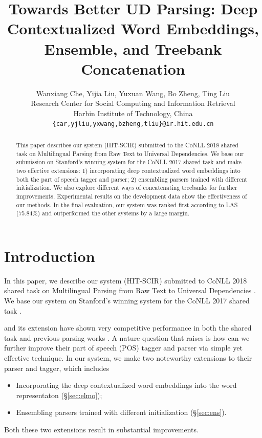 \documentclass[11pt,a4paper]{article}
\title{Towards Better UD Parsing: Deep Contextualized Word Embeddings, Ensemble, and Treebank Concatenation}
\author{Wanxiang Che, Yijia Liu, Yuxuan Wang, Bo Zheng, Ting Liu \\
	Research Center for Social Computing and Information Retrieval \\
	Harbin Institute of Technology, China \\
	{\tt \{car,yjliu,yxwang,bzheng,tliu\}@ir.hit.edu.cn}	}
\date{}
\begin{document}
\maketitle


\begin{abstract}
This paper describes our system (HIT-SCIR)
submitted to the  CoNLL 2018 shared
task on Multilingual Parsing from Raw Text to 
Universal Dependencies.
We base our submission on Stanford's winning system for the CoNLL 2017 shared task
and make two effective extensions: 
1) incorporating deep contextualized
word embeddings into both the part of speech
tagger and parser;
2) ensembling parsers trained with different initialization.
We also explore different ways of concatenating treebanks
for further improvements.
Experimental results on the development data
show the effectiveness of our methods.
In the final evaluation,
our system was ranked first according to LAS (75.84\%)
and outperformed the other systems by a large margin.

\end{abstract}

\section{Introduction}

In this paper, we describe our system (HIT-SCIR) submitted to CoNLL 2018 shared
task on Multilingual Parsing from Raw Text to 
Universal Dependencies \cite{udst:overview}.
We base our system on Stanford's winning system \citep[\S\ref{sec:biaffine}]{dozat-qi-manning:2017:K17-3}
for the CoNLL 2017 shared task \cite{udst:overview2017}.

\citet{DBLP:journals/corr/DozatM16} and
its extension \cite{dozat-qi-manning:2017:K17-3} have
shown very competitive performance in both the shared task \cite{dozat-qi-manning:2017:K17-3}
and previous parsing works \cite{ma-hovy:2017:I17-1,shi-huang-lee:2017:EMNLP2017,N18-1088,DBLP:journals/corr/abs-1805-01087}.
A nature question that raises is how can we further improve
their part of speech (POS) tagger and parser
via simple yet effective technique.
In our system, we make two noteworthy extensions to their parser and tagger,
which includes
\begin{itemize}
	\item Incorporating the deep contextualized word embeddings \cite[ELMo]{N18-1202} into the word representaton (\S\ref{sec:elmo});
	\item Ensembling parsers trained with different initialization (\S\ref{sec:ens}).
\end{itemize}
Both these two extensions result in substantial improvements. 
\end{document}
